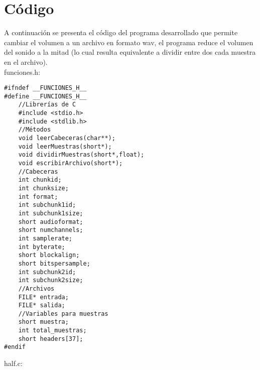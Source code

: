 \section{Código}
A continuación se presenta el código del programa desarrollado que permite cambiar el volumen a un archivo en formato wav, el programa reduce el volumen del sonido a la mitad (lo cual resulta equivalente a dividir entre dos cada muestra en el archivo).\\
funciones.h:
\begin{lstlisting}[style=CStyle]
#ifndef __FUNCIONES_H__
#define __FUNCIONES_H__
	//Librerías de C
	#include <stdio.h>
	#include <stdlib.h>
	//Métodos
	void leerCabeceras(char**);
	void leerMuestras(short*);
	void dividirMuestras(short*,float);
	void escribirArchivo(short*);
	//Cabeceras
	int chunkid;
	int chunksize;
	int format;
	int subchunk1id;
	int subchunk1size;
	short audioformat;
	short numchannels;
	int samplerate;
	int byterate;
	short blockalign;
	short bitspersample;
	int subchunk2id;
	int subchunk2size;
	//Archivos
	FILE* entrada;
	FILE* salida;
	//Variables para muestras
	short muestra;
	int total_muestras;
	short headers[37];
#endif
\end{lstlisting}
\newpage
half.c:
